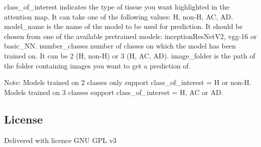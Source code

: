 class\+\_\+of\+\_\+interest indicates the type of tissue you want highlighted in the attention map. It can take one of the following values\+: H, non-\/H, AC, AD. model\+\_\+name is the name of the model to be used for prediction. It should be chosen from one of the available pretrained models\+: inception\+Res\+Net\+V2, vgg-\/16 or basic\+\_\+\+NN. number\+\_\+classes number of classes on which the model has been trained on. It can be 2 (H, non-\/H) or 3 (H, AC, AD). image\+\_\+folder is the path of the folder containing images you want to get a prediction of.

Note\+: Models trained on 2 classes only support class\+\_\+of\+\_\+interest = H or non-\/H. Models trained on 3 classes support class\+\_\+of\+\_\+interest = H, AC or AD.

\subsection*{License}

Delivered with licence G\+NU G\+PL v3 